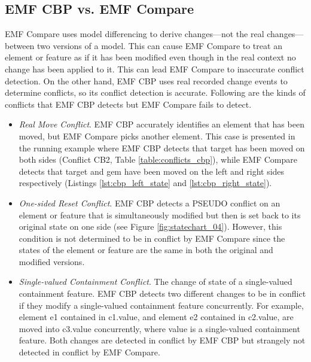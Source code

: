 \subsection{EMF CBP vs. EMF Compare}
\label{sec:emf_cbp_vs_emf_compare}
EMF Compare uses model differencing to derive changes—not the real changes—between two versions of a model. This can cause EMF Compare to treat an element or feature as if it has been modified even though in the real context no change has been applied to it. This can lead EMF Compare to inaccurate conflict detection. On the other hand, EMF CBP uses real recorded change events to determine conflicts, so its conflict detection is accurate. Following are the kinds of conflicts that EMF CBP detects but EMF Compare fails to detect.
\begin{itemize}
  
  \item \emph{Real Move Conflict}. EMF CBP accurately identifies an element that has been moved, but EMF Compare picks another element. This case is presented in the running example where EMF CBP detects that \textsf{target} has been moved on both sides (Conflict CB2, Table \ref{table:conflicts_cbp}), while EMF Compare detects that \textsf{target} and \textsf{gem} have been moved on the left and right sides respectively (Listings \ref{lst:cbp_left_state} and \ref{lst:cbp_right_state}).
  
  \item \emph{One-sided Reset Conflict}. EMF CBP detects a \textsf{PSEUDO} conflict on an element or feature that is simultaneously modified but then is set back to its original state on one side (see Figure \ref{fig:statechart_04}). However, this condition is not determined to be in conflict by EMF Compare since the states of the element or feature are the same in both the original and modified versions.
  
  \item \emph{Single-valued Containment Conflict}. The change of state of a single-valued containment feature. EMF CBP detects two different changes to be in conflict if they modify a single-valued containment feature concurrently. For example, element \textsf{e1} contained in \textsf{c1}.\textsf{value}, and element \textsf{e2} contained in \textsf{c2}.\textsf{value}, are moved into \textsf{c3}.\textsf{value} concurrently, where \textsf{value} is a single-valued containment feature. Both changes are detected in conflict by EMF CBP but strangely not detected in conflict by EMF Compare.
\end{itemize}

